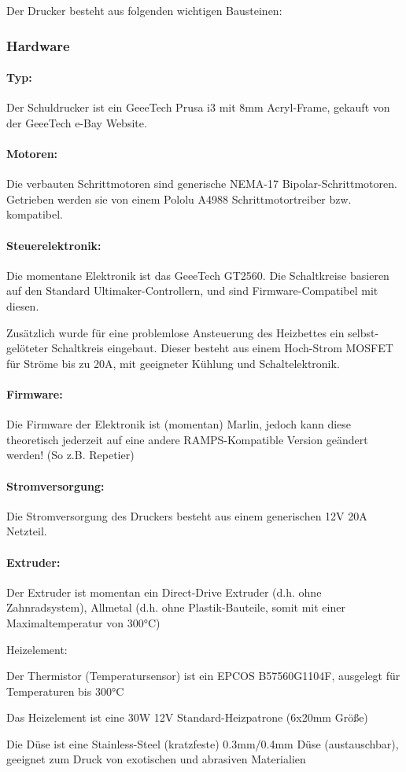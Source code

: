 Der Drucker besteht aus folgenden wichtigen Bausteinen: 

\subsubsection{Hardware}

\paragraph{Typ:}
Der Schuldrucker ist ein GeeeTech Prusa i3 mit 8mm Acryl-Frame, gekauft von der GeeeTech e-Bay Website.

\paragraph{Motoren:} 
Die verbauten Schrittmotoren sind generische NEMA-17 Bipolar-Schrittmotoren. Getrieben werden sie von einem Pololu A4988 Schrittmotortreiber bzw. kompatibel.

\paragraph{Steuerelektronik:}
Die momentane Elektronik ist das GeeeTech GT2560. Die Schaltkreise basieren auf den Standard Ultimaker-Controllern, und sind Firmware-Compatibel mit diesen.

Zusätzlich wurde für eine problemlose Ansteuerung des Heizbettes ein selbst-gelöteter Schaltkreis eingebaut.
Dieser besteht aus einem Hoch-Strom MOSFET für Ströme bis zu 20A, mit geeigneter Kühlung und Schaltelektronik.

\paragraph{Firmware:}
Die Firmware der Elektronik ist (momentan) Marlin, jedoch kann diese theoretisch jederzeit auf eine andere RAMPS-Kompatible Version geändert werden! (So z.B. Repetier)

\paragraph{Stromversorgung:}
Die Stromversorgung des Druckers besteht aus einem generischen 12V 20A Netzteil.

\paragraph{Extruder:}
Der Extruder ist momentan ein Direct-Drive Extruder (d.h. ohne Zahnradsystem), Allmetal (d.h. ohne Plastik-Bauteile, somit mit einer Maximaltemperatur von 300°C)
\begin{labeling}{Heizelement:}
\item[Thermistor:] Der Thermistor (Temperatursensor) ist ein EPCOS B57560G1104F, ausgelegt für Temperaturen bis 300°C
\item[Heizelement:] Das Heizelement ist eine 30W 12V Standard-Heizpatrone (6x20mm Größe)
\item[Düse:] Die Düse ist eine Stainless-Steel (kratzfeste) 0.3mm/0.4mm Düse (austauschbar), geeignet zum Druck von exotischen und abrasiven Materialien
\end{labeling}

